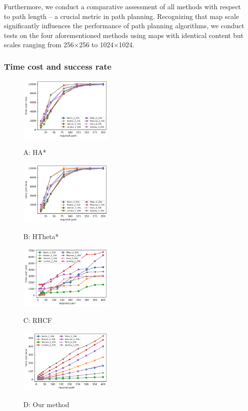 \documentclass[lettersize,journal]{IEEEtran}
\begin{document}
Furthermore, we conduct a comparative assessment of all methods with respect to path length – a crucial metric in path planning. Recognizing that map scale significantly influences the performance of path planning algorithms, we conduct tests on the four aforementioned methods using maps with identical content but scales ranging from 256$\times$256 to 1024$\times$1024.    
    
\subsubsection{Time cost and success rate}

\begin{figure}[t] \scriptsize
\begin{minipage}{.245\linewidth}
  \centerline{\includegraphics[width=4.6cm]{HsAs_time_and_count.png}}
  \centerline{A: HA*}
\end{minipage}
\hfill
\begin{minipage}{.245\linewidth}
  \centerline{\includegraphics[width=4.6cm]{HsTs_time_and_count.png}}
  \centerline{B: HTheta*}
\end{minipage}
\hfill
\begin{minipage}{.245\linewidth}
  \centerline{\includegraphics[width=4.6cm]{RHCF_time_and_count.png}}
  \centerline{C: RHCF}
\end{minipage}
\hfill
\begin{minipage}{.245\linewidth}
  \centerline{\includegraphics[width=4.6cm]{RJ_time_and_count.png}}
  \centerline{D: Our method}
\end{minipage}
\vfill


\end{figure}
\end{document}
